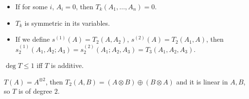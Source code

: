     \begin{theorem}
        \begin{itemize}
            \item If for some $i$, $A_i = 0$, then $T_k(A_1, \ldots, A_n) = 0$.
            \item $T_k$ is symmetric in its variables.
            \item If we define $s^{(1)}(A) = T_2(A,A_2)$,
            $s^{(2)}(A) = T_2(A_1,A)$,
            then $s_2^{(1)}(A_1, A_2; A_3) = s_2^{(2)}(A_1; A_2, A_3) 
            = T_3(A_1,A_2,A_3)$.
        \end{itemize}
    \end{theorem}
    
    \begin{example}
        $\deg T \leq 1$ iff $T$ is additive.
    \end{example}
    
    \begin{example}
        $T(A) = A^{\otimes 2}$,
        then $T_2(A,B) = (A \otimes B) \oplus (B \otimes A)$
        and it is linear in $A,B$, so $T$ is of degree $2$.
    \end{example}




    
    
















 
 